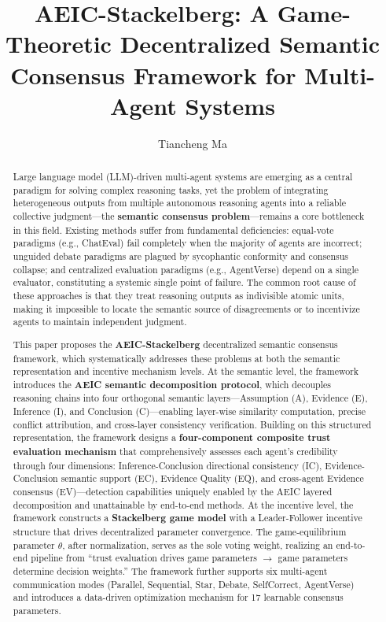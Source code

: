\documentclass[12pt,a4paper]{article}
\title{\textbf{AEIC-Stackelberg: A Game-Theoretic Decentralized Semantic Consensus Framework for Multi-Agent Systems}}
\author{Tiancheng Ma}
\date{}
\begin{document}
\maketitle

\begin{abstract}
Large language model (LLM)-driven multi-agent systems are emerging as a central paradigm for solving complex reasoning tasks, yet the problem of integrating heterogeneous outputs from multiple autonomous reasoning agents into a reliable collective judgment---the \textbf{semantic consensus problem}---remains a core bottleneck in this field. Existing methods suffer from fundamental deficiencies: equal-vote paradigms (e.g., ChatEval) fail completely when the majority of agents are incorrect; unguided debate paradigms are plagued by sycophantic conformity and consensus collapse; and centralized evaluation paradigms (e.g., AgentVerse) depend on a single evaluator, constituting a systemic single point of failure. The common root cause of these approaches is that they treat reasoning outputs as indivisible atomic units, making it impossible to locate the semantic source of disagreements or to incentivize agents to maintain independent judgment.

This paper proposes the \textbf{AEIC-Stackelberg} decentralized semantic consensus framework, which systematically addresses these problems at both the semantic representation and incentive mechanism levels. At the semantic level, the framework introduces the \textbf{AEIC semantic decomposition protocol}, which decouples reasoning chains into four orthogonal semantic layers---Assumption (A), Evidence (E), Inference (I), and Conclusion (C)---enabling layer-wise similarity computation, precise conflict attribution, and cross-layer consistency verification. Building on this structured representation, the framework designs a \textbf{four-component composite trust evaluation mechanism} that comprehensively assesses each agent's credibility through four dimensions: Inference-Conclusion directional consistency (IC), Evidence-Conclusion semantic support (EC), Evidence Quality (EQ), and cross-agent Evidence consensus (EV)---detection capabilities uniquely enabled by the AEIC layered decomposition and unattainable by end-to-end methods. At the incentive level, the framework constructs a \textbf{Stackelberg game model} with a Leader-Follower incentive structure that drives decentralized parameter convergence. The game-equilibrium parameter $\theta$, after normalization, serves as the sole voting weight, realizing an end-to-end pipeline from ``trust evaluation drives game parameters $\to$ game parameters determine decision weights.'' The framework further supports six multi-agent communication modes (Parallel, Sequential, Star, Debate, SelfCorrect, AgentVerse) and introduces a data-driven optimization mechanism for 17 learnable consensus parameters.


\end{abstract}
\end{document}
